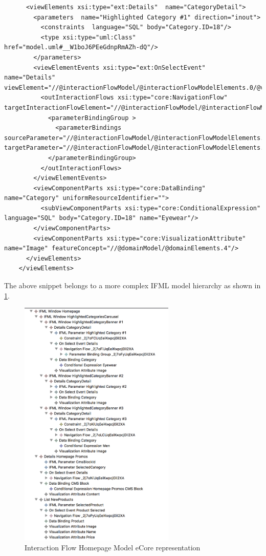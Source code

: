 \lstset{language=XML}
\begin{lstlisting} 
      <viewElements xsi:type="ext:Details"  name="CategoryDetail">
        <parameters  name="Highlighted Category #1" direction="inout">
          <constraints  language="SQL" body="Category.ID=18"/>
          <type xsi:type="uml:Class" href="model.uml#__W1boJ6PEeGdnpRmAZh-dQ"/>
        </parameters>
        <viewElementEvents xsi:type="ext:OnSelectEvent"  name="Details" viewElement="//@interactionFlowModel/@interactionFlowModelElements.0/@viewElements.0/@viewElements.0">
          <outInteractionFlows xsi:type="core:NavigationFlow"  targetInteractionFlowElement="//@interactionFlowModel/@interactionFlowModelElements.6">
            <parameterBindingGroup >
              <parameterBindings  sourceParameter="//@interactionFlowModel/@interactionFlowModelElements.0/@viewElements.0/@viewElements.0/@viewElements.0/@parameters.0" targetParameter="//@interactionFlowModel/@interactionFlowModelElements.6/@parameters.0"/>
            </parameterBindingGroup>
          </outInteractionFlows>
        </viewElementEvents>
        <viewComponentParts xsi:type="core:DataBinding"  name="Category" uniformResourceIdentifier="">
          <subViewComponentParts xsi:type="core:ConditionalExpression"  language="SQL" body="Category.ID=18" name="Eyewear"/>
        </viewComponentParts>
        <viewComponentParts xsi:type="core:VisualizationAttribute"  name="Image" featureConcept="//@domainModel/@domainElements.4"/>
      </viewElements>
    </viewElements>
\end{lstlisting}

\newpage
The above snippet belongs to a more complex IFML model hierarchy as shown in \ref{fig:ifml-before-hierarchy-homepage}.

\vspace{0.5cm}
\begin{figure}[H]
  \centering
    \includegraphics[height=12cm]{images/diagrams/before/ifml-hierarchy-homepage.png}
  \caption{Interaction Flow Homepage Model eCore representation}
  \label{fig:ifml-before-hierarchy-homepage}
\end{figure}
\vspace{0.5cm}

